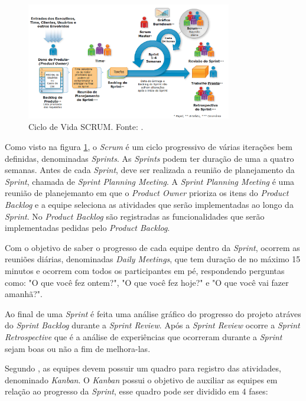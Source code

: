 \begin{figure}[H]
	\centering
	\includegraphics[width=0.8\textwidth]{figuras/ciclo_de_vida_scrum.png}
	\caption{Ciclo de Vida SCRUM. Fonte: \cite{scrum}.}
	\label{img:ciclo_de_vida_scrum}
\end{figure}

Como visto na figura \ref{img:ciclo_de_vida_scrum}, o \textit{Scrum} é um ciclo progressivo de várias iterações bem definidas, denominadas \textit{Sprints}. As \textit{Sprints} podem ter duração de uma a quatro semanas. Antes de cada \textit{Sprint}, deve ser realizada a reunião de planejamento da \textit{Sprint}, chamada de \textit{Sprint Planning Meeting}. A \textit{Sprint Planning Meeting} é uma reunião de planejemanto em que o \textit{Product Owner}
prioriza os itens do \textit{Product Backlog} e a equipe seleciona as atividades que serão implementadas ao longo da \textit{Sprint}. No \textit{Product Backlog} são registradas as funcionalidades que serão implementadas pedidas pelo \textit{Product Backlog}. 

Com o objetivo de saber o progresso de cada equipe dentro da \textit{Sprint}, ocorrem as reuniões diárias, denominadas \textit{Daily Meetings}, que tem duração de no máximo 15 minutos e ocorrem com todos os participantes em pé, respondendo perguntas como: "O que você fez ontem?", "O que você fez hoje?" e "O que você vai fazer amanhã?". 

Ao final de uma \textit{Sprint} é feita uma análise gráfico do progresso do projeto atráves do \textit{Sprint Backlog} durante a \textit{Sprint Review}. Após a \textit{Sprint Review} ocorre a \textit{Sprint Retrospective} que é a análise de experiências que ocorreram durante a \textit{Sprint} sejam boas ou não a fim de melhora-las.

Segundo \cite{fowler}, as equipes devem possuir um quadro para registro das atividades, denominado \textit{Kanban}. O \textit{Kanban} possui o objetivo de auxiliar as equipes em relação ao progresso da \textit{Sprint}, esse quadro pode ser dividido em 4 fases:

